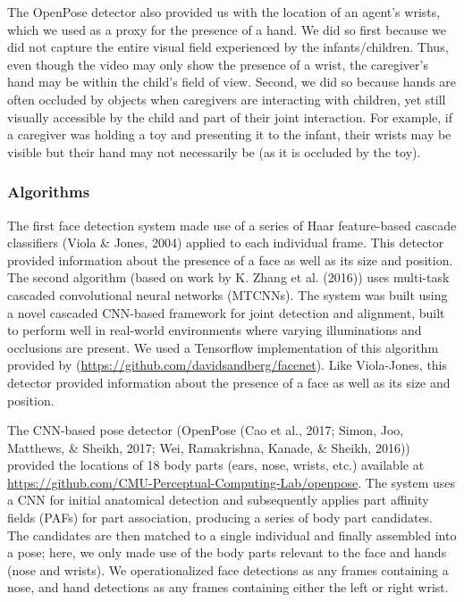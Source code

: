 \documentclass[10pt, letterpaper]{article}
\begin{document}
The OpenPose detector also provided us with the location of an agent's
wrists, which we used as a proxy for the presence of a hand. We did so
first because we did not capture the entire visual field experienced by
the infants/children. Thus, even though the video may only show the
presence of a wrist, the caregiver's hand may be within the child's
field of view. Second, we did so because hands are often occluded by
objects when caregivers are interacting with children, yet still
visually accessible by the child and part of their joint interaction.
For example, if a caregiver was holding a toy and presenting it to the
infant, their wrists may be visible but their hand may not necessarily
be (as it is occluded by the toy).

\subsubsection{Algorithms}\label{algorithms}

The first face detection system made use of a series of Haar
feature-based cascade classifiers (Viola \& Jones, 2004) applied to each
individual frame. This detector provided information about the presence
of a face as well as its size and position. The second algorithm (based
on work by K. Zhang et al. (2016)) uses multi-task cascaded
convolutional neural networks (MTCNNs). The system was built using a
novel cascaded CNN-based framework for joint detection and alignment,
built to perform well in real-world environments where varying
illuminations and occlusions are present. We used a Tensorflow
implementation of this algorithm provided by
(\url{https://github.com/davidsandberg/facenet}). Like Viola-Jones, this
detector provided information about the presence of a face as well as
its size and position.

The CNN-based pose detector (OpenPose (Cao et al., 2017; Simon, Joo,
Matthews, \& Sheikh, 2017; Wei, Ramakrishna, Kanade, \& Sheikh, 2016))
provided the locations of 18 body parts (ears, nose, wrists, etc.)
available at
\url{https://github.com/CMU-Perceptual-Computing-Lab/openpose}. The
system uses a CNN for initial anatomical detection and subsequently
applies part affinity fields (PAFs) for part association, producing a
series of body part candidates. The candidates are then matched to a
single individual and finally assembled into a pose; here, we only made
use of the body parts relevant to the face and hands (nose and wrists).
We operationalized face detections as any frames containing a nose, and
hand detections as any frames containing either the left or right wrist.
\end{document}

